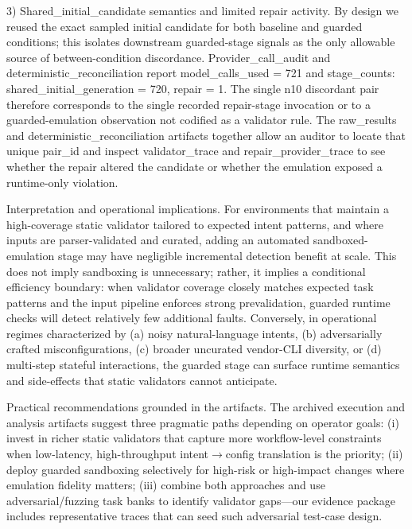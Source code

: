 \documentclass[conference]{IEEEtran}
\begin{document}
3) Shared\_initial\_candidate semantics and limited repair activity. By design we reused the exact sampled initial candidate for both baseline and guarded conditions; this isolates downstream guarded-stage signals as the only allowable source of between-condition discordance. Provider\_call\_audit and deterministic\_reconciliation report model\_calls\_used = 721 and stage\_counts: shared\_initial\_generation = 720, repair = 1. The single n10 discordant pair therefore corresponds to the single recorded repair-stage invocation or to a guarded-emulation observation not codified as a validator rule. The raw\_results and deterministic\_reconciliation artifacts together allow an auditor to locate that unique pair\_id and inspect validator\_trace and repair\_provider\_trace to see whether the repair altered the candidate or whether the emulation exposed a runtime-only violation.

Interpretation and operational implications. For environments that maintain a high-coverage static validator tailored to expected intent patterns, and where inputs are parser-validated and curated, adding an automated sandboxed-emulation stage may have negligible incremental detection benefit at scale. This does not imply sandboxing is unnecessary; rather, it implies a conditional efficiency boundary: when validator coverage closely matches expected task patterns and the input pipeline enforces strong prevalidation, guarded runtime checks will detect relatively few additional faults. Conversely, in operational regimes characterized by (a) noisy natural-language intents, (b) adversarially crafted misconfigurations, (c) broader uncurated vendor-CLI diversity, or (d) multi-step stateful interactions, the guarded stage can surface runtime semantics and side-effects that static validators cannot anticipate.

Practical recommendations grounded in the artifacts. The archived execution and analysis artifacts suggest three pragmatic paths depending on operator goals: (i) invest in richer static validators that capture more workflow-level constraints when low-latency, high-throughput intent\ensuremath{\rightarrow}config translation is the priority; (ii) deploy guarded sandboxing selectively for high-risk or high-impact changes where emulation fidelity matters; (iii) combine both approaches and use adversarial/fuzzing task banks to identify validator gaps---our evidence package includes representative traces that can seed such adversarial test-case design.
\end{document}
